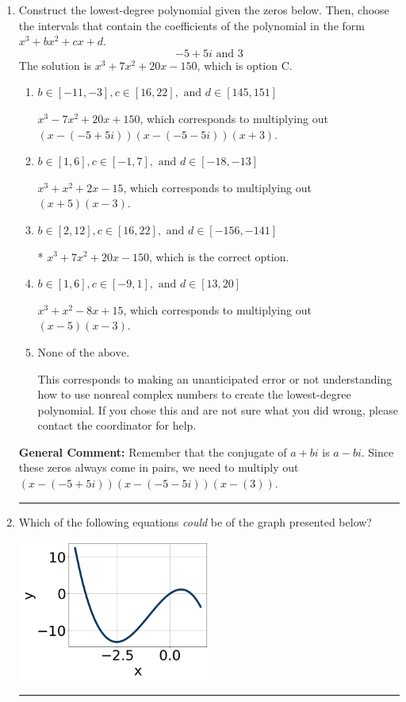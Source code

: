 \documentclass{extbook}[14pt]
\newcommand{\litem}[1]{\item #1

\rule{\textwidth}{0.4pt}}
\begin{document}
\begin{enumerate}\litem{
Construct the lowest-degree polynomial given the zeros below. Then, choose the intervals that contain the coefficients of the polynomial in the form $x^3+bx^2+cx+d$.
\[ -5 + 5 i \text{ and } 3 \]The solution is \( x^{3} +7 x^{2} +20 x -150 \), which is option C.\begin{enumerate}[label=\Alph*.]
\item \( b \in [-11, -3], c \in [16, 22], \text{ and } d \in [145, 151] \)

$x^{3} -7 x^{2} +20 x + 150$, which corresponds to multiplying out $(x-(-5 + 5 i))(x-(-5 - 5 i))(x + 3)$.
\item \( b \in [1, 6], c \in [-1, 7], \text{ and } d \in [-18, -13] \)

$x^{3} + x^{2} +2 x -15$, which corresponds to multiplying out $(x + 5)(x -3)$.
\item \( b \in [2, 12], c \in [16, 22], \text{ and } d \in [-156, -141] \)

* $x^{3} +7 x^{2} +20 x -150$, which is the correct option.
\item \( b \in [1, 6], c \in [-9, 1], \text{ and } d \in [13, 20] \)

$x^{3} + x^{2} -8 x + 15$, which corresponds to multiplying out $(x -5)(x -3)$.
\item \( \text{None of the above.} \)

This corresponds to making an unanticipated error or not understanding how to use nonreal complex numbers to create the lowest-degree polynomial. If you chose this and are not sure what you did wrong, please contact the coordinator for help.
\end{enumerate}

\textbf{General Comment:} Remember that the conjugate of $a+bi$ is $a-bi$. Since these zeros always come in pairs, we need to multiply out $(x-(-5 + 5 i))(x-(-5 - 5 i))(x-(3))$.
}
\litem{
Which of the following equations \textit{could} be of the graph presented below?

\begin{center}
    \includegraphics[width=0.5\textwidth]{../Figures/polyGraphToFunctionB.png}
\end{center}


}
\end{enumerate}
\end{document}
